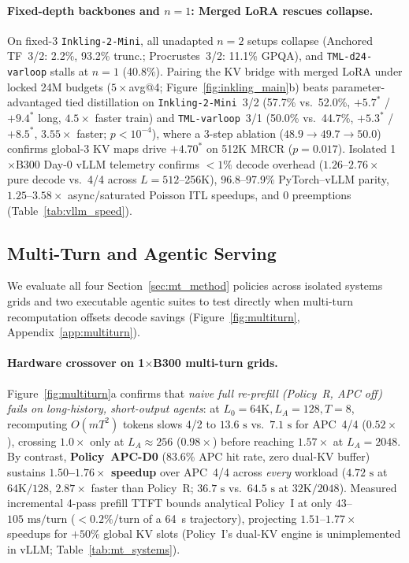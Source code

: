 \documentclass[11pt]{article}
\begin{document}
\paragraph{Fixed-depth backbones and $n{=}1$: Merged LoRA rescues collapse.}
On fixed-3 \texttt{Inkling-2-Mini}, all unadapted $n{=}2$ setups collapse (Anchored TF~3/2: 2.2\%, 93.2\% trunc.;
Procrustes~3/2: 11.1\% GPQA), and \texttt{TML-d24-varloop} stalls at $n{=}1$ (40.8\%). Pairing the KV bridge with
merged LoRA under locked 24M budgets ($5\times$avg@4; Figure~\ref{fig:inkling_main}b) beats parameter-advantaged tied
distillation on \texttt{Inkling-2-Mini}~3/2 (57.7\% vs.\ 52.0\%, $+5.7^\ast$ / $+9.4^\ast$ long, $4.5\times$ faster
train) and \texttt{TML-varloop}~3/1 (50.0\% vs.\ 44.7\%, $+5.3^\ast$ / $+8.5^\ast$, $3.55\times$ faster; $p{<}10^{-4}$),
where a 3-step ablation ($48.9\to49.7\to50.0$) confirms global-3 KV maps drive $+4.70^\ast$ on 512K MRCR ($p{=}0.017$).
Isolated 1$\times$B300 Day-0 vLLM telemetry confirms $<1\%$ decode overhead ($1.26$--$2.76\times$ pure decode vs.\ 4/4
across $L{=}512$--256K), 96.8--97.9\% PyTorch--vLLM parity, $1.25$--$3.58\times$ async/saturated Poisson ITL speedups,
and 0 preemptions (Table~\ref{tab:vllm_speed}).

\subsection{Multi-Turn and Agentic Serving}
\label{sec:multiturn}

We evaluate all four Section~\ref{sec:mt_method} policies across isolated systems grids and two executable agentic suites
to test directly when multi-turn recomputation offsets decode savings (Figure~\ref{fig:multiturn},
Appendix~\ref{app:multiturn}).

\paragraph{Hardware crossover on 1$\times$B300 multi-turn grids.}
Figure~\ref{fig:multiturn}a confirms that \emph{naive full re-prefill (Policy~R, APC off) fails on long-history,
short-output agents}: at $L_0{=}64\text{K}, L_A{=}128, T{=}8$, recomputing $O(m T^2)$ tokens slows 4/2 to $13.6\text{ s}$
vs.\ $7.1\text{ s}$ for APC~4/4 ($0.52\times$), crossing $1.0\times$ only at $L_A{\approx}256$ ($0.98\times$) before
reaching $1.57\times$ at $L_A{=}2048$. By contrast, \textbf{Policy~APC-D0} (83.6\% APC hit rate, zero dual-KV buffer)
sustains \textbf{$1.50$--$1.76\times$ speedup} over APC~4/4 across \emph{every} workload ($4.72\text{ s}$ at
$64\text{K}/128$, $2.87\times$ faster than Policy~R; $36.7\text{ s}$ vs.\ $64.5\text{ s}$ at $32\text{K}/2048$).
Measured incremental 4-pass prefill TTFT bounds analytical Policy~I at only $43$--$105\text{ ms/turn}$ ($<0.2\%$/turn
of a 64~s trajectory), projecting $1.51$--$1.77\times$ speedups for $+50\%$ global KV slots (Policy~I's dual-KV engine
is unimplemented in vLLM; Table~\ref{tab:mt_systems}).
\end{document}
